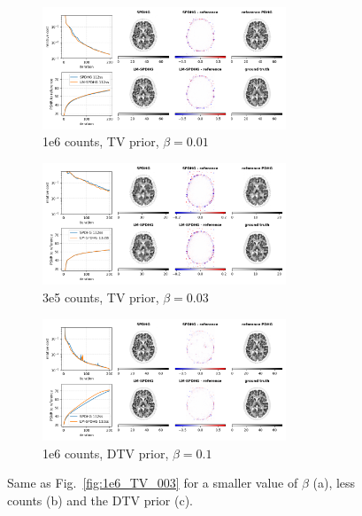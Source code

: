 \begin{figure}
  \centering
  \begin{subfigure}[]{1.0\textwidth}
    \centering
    \includegraphics[width=0.8\textwidth]{./figs/brain2d_counts_1.0E+06_seed_1_beta_1.0E-02_prior_TV_niter_ref_20000_fwhm_4.5_4.5_niter_200.png}
    \caption{1e6 counts, TV prior, $\beta = 0.01$}
  \end{subfigure}
  \vfill
  \begin{subfigure}[]{1.0\textwidth}
    \centering
    \includegraphics[width=0.8\textwidth]{./figs/brain2d_counts_3.0E+05_seed_1_beta_3.0E-02_prior_TV_niter_ref_20000_fwhm_4.5_4.5_niter_200.png}
    \caption{3e5 counts, TV prior, $\beta = 0.03$}
  \end{subfigure}
  \vfill
  \begin{subfigure}[]{1.0\textwidth}
    \centering
    \includegraphics[width=0.8\textwidth]{./figs/brain2d_counts_1.0E+06_seed_1_beta_1.0E-01_prior_DTV_niter_ref_20000_fwhm_4.5_4.5_niter_200.png}
    \caption{1e6 counts, DTV prior, $\beta = 0.1$}
  \end{subfigure}
  \caption{Same as Fig.~\ref{fig:1e6_TV_003} for a smaller value of $\beta$ (a), less counts (b) and the DTV prior (c).}
  \label{fig:lm-spdhg-var}
\end{figure}




